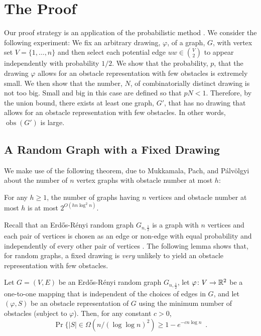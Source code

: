 \documentclass{patmorin}
\DeclareMathOperator{\obs}{obs}
\begin{document}
\section{The Proof}

Our proof strategy is an application of the probabilistic method
\cite{alon.spencer:probabilistic}.  We consider the following
experiment: We fix an arbitrary drawing, $\varphi$, of a graph, $G$,
with vertex set $V=\{1,\ldots,n\}$ and then select each potential edge
$uw\in\binom{V}{2}$ to appear independently with probability $1/2$.
We show that the probability, $p$, that the drawing $\varphi$ allows
for an obstacle representation with few obstacles is extremely small.
We then show that the number, $N$, of combinatorially distinct drawing is
not too big.  Small and big in this case are defined so that $pN < 1$.
Therefore, by the union bound, there exists at least one graph, $G'$,
that has no drawing that allows for an obstacle representation with
few obstacles.  In other words, $\obs(G')$ is large.

\subsection{A Random Graph with a Fixed Drawing}

We make use of the following theorem, due to Mukkamala, Pach, and
P\'alv\"olgyi \cite[Theorem~1]{mukkamala.pach.ea:lower} about the number
of $n$ vertex graphs with obstacle number at most $h$:
\begin{thm}
  For any $h\ge 1$, the number of graphs having $n$ vertices and
  obstacle number at most $h$ is at most $2^{O(hn\log^2 n)}$.
\end{thm}

Recall that an Erd\H{o}s-R\'enyi random graph $G_{n,\frac{1}{2}}$ is a
graph with $n$ vertices and each pair of vertices is chosen as an edge
or non-edge with equal probability and independently of every other pair
of vertices \cite{erdos.renyi:random}.  The following lemma shows that,
for random graphs, a fixed drawing is \emph{very} unlikely to yield
an obstacle representation with few obstacles.


\begin{lem}
  Let $G=(V,E)$ be an Erd\H{o}s-R\'enyi random graph $G_{n,\frac{1}{2}}$,
  let $\varphi\colon V\to \mathbb{R}^2$ be a one-to-one mapping that is
  independent of the choices of edges in $G$, and let $(\varphi, S)$ be
  an obstacle representation of $G$ using the minimum number of obstacles
  (subject to $\varphi$).  Then, for any constant $c>0$,
  \[
     \Pr\{|S| \in \Omega(n/(\log\log n)^2) \ge 1-e^{-cn\log n}  \enspace .
  \] 
\end{lem}
\end{document}
